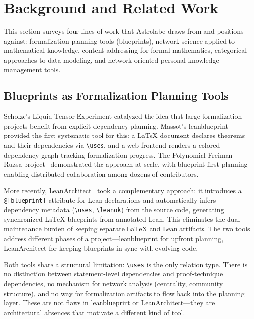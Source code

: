 \section{Background and Related Work}
\label{sec:background}


This section surveys four lines of work that Astrolabe draws from and positions against: formalization planning tools (blueprints), network science applied to mathematical knowledge, content-addressing for formal mathematics, categorical approaches to data modeling, and network-oriented personal knowledge management tools.


\subsection{Blueprints as Formalization Planning Tools}
\label{sec:bg-blueprints}

Scholze's Liquid Tensor Experiment catalyzed the idea that large formalization projects benefit from explicit dependency planning. Massot's leanblueprint~\cite{Massot2020} provided the first systematic tool for this: a \LaTeX{} document declares theorems and their dependencies via \texttt{\textbackslash uses}, and a web frontend renders a colored dependency graph tracking formalization progress. The Polynomial Freiman--Ruzsa project~\cite{Tao2023} demonstrated the approach at scale, with blueprint-first planning enabling distributed collaboration among dozens of contributors.

More recently, LeanArchitect~\cite{Zhu2026} took a complementary approach: it introduces a \texttt{@[blueprint]} attribute for Lean declarations and automatically infers dependency metadata (\texttt{\textbackslash uses}, \texttt{\textbackslash leanok}) from the source code, generating synchronized \LaTeX{} blueprints from annotated Lean. This eliminates the dual-maintenance burden of keeping separate \LaTeX{} and Lean artifacts. The two tools address different phases of a project---leanblueprint for upfront planning, LeanArchitect for keeping blueprints in sync with evolving code.

Both tools share a structural limitation: \texttt{\textbackslash uses} is the only relation type. There is no distinction between statement-level dependencies and proof-technique dependencies, no mechanism for network analysis (centrality, community structure), and no way for formalization artifacts to flow back into the planning layer. These are not flaws in leanblueprint or LeanArchitect---they are architectural absences that motivate a different kind of tool.


